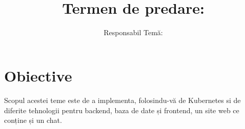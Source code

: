 \documentclass{article}
\title{
\textmd{\textbf{\MNClass \\ \MNTitle}}\\
\normalsize\vspace{0.1in}\small{Termen de predare: \MNDueDate}\\
}
\author{Responsabil Temă: \textbf{\MNAuthorName}}
\date{} %
\begin{document}
\maketitle





\section{Obiective}

Scopul acestei teme este de a implementa, folosindu-vă de Kubernetes si de diferite tehnologii pentru backend, baza de date și frontend, un site web ce conține și un chat.


\end{document}
